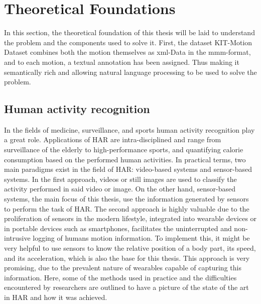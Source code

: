 \chapter{Theoretical Foundations}\label{chap:theoretical_foundations}
	In this section, the theoretical foundation of this thesis will be laid to understand the problem and the components used to solve it. First, the dataset KIT-Motion Dataset combines both the motion themselves as xml-Data in the mmm-format, and to each motion, a textual annotation has been assigned. Thus making it semantically rich and allowing natural language processing to be used to solve the problem.
	\section{Human activity recognition}\label{sec:HAR}
		In the fields of medicine, surveillance, and sports human activity recognition play a great role. Applications of HAR are intra-disciplined and range from surveillance of the elderly to high-performance sports, and quantifying calorie consumption based on the performed human activities. In practical terms, two main paradigms exist in the field of HAR: video-based systems and sensor-based systems\cite{chen2021deep}. In the first approach, videos or still images are used to classify the activity performed in said video or image. On the other hand, sensor-based systems, the main focus of this thesis, use the information generated by sensors to perform the task of HAR. The second approach is highly valuable due to the proliferation of sensors in the modern lifestyle, integrated into wearable devices or in portable devices such as smartphones, facilitates the uninterrupted and non-intrusive logging of humans motion information\cite{chen2021deep}.\newline
		To implement this, it might be very helpful to use sensors to know the relative position of a body part, its speed, and its acceleration, which is also the base for this thesis. This approach is very promising, due to the prevalent nature of wearables capable of capturing this information. Here, some of the methods used in practice and the difficulties encountered by researchers are outlined to have a picture of the state of the art in HAR and how it was achieved.\newline
